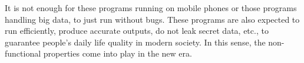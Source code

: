 It is not enough for these programs running on mobile phones or those programs handling big data, 
 to just run without bugs. 
 These programs are also expected to run efficiently, produce accurate outputs, do not leak secret data, etc.,
 to guarantee people's daily life
 quality in modern society.
 In this sense, the non-functional properties
 come into play in the new era.


